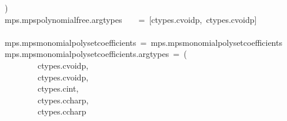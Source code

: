 \documentclass{article}\usepackage[]{graphicx}\usepackage[dvipsnames,table]{xcolor}
\makeatletter
\newcommand{\hlopt}[1]{\textcolor[rgb]{0,0,0}{#1}}%
\newcommand{\hldef}[1]{\textcolor[rgb]{0.345,0.345,0.345}{#1}}%
\newenvironment{kframe}{%
 \def\at@end@of@kframe{}%
 \ifinner\ifhmode%
  \def\at@end@of@kframe{\end{minipage}}%
  \begin{minipage}{\columnwidth}%
 \fi\fi%
 \def\FrameCommand##1{\hskip\@totalleftmargin \hskip-\fboxsep
 \colorbox{shadecolor}{##1}\hskip-\fboxsep
     \hskip-\linewidth \hskip-\@totalleftmargin \hskip\columnwidth}%
 \MakeFramed {\advance\hsize-\width
   \@totalleftmargin\z@ \linewidth\hsize
   \@setminipage}}%
 {\par\unskip\endMakeFramed%
 \at@end@of@kframe}
\newenvironment{knitrout}{}{} %
\makeatother
\begin{document}
\begin{center}
\begin{minipage}[m]{15cm}
\begin{knitrout}
\begin{kframe}
\hldef{}\hlopt{)}\hspace*{\fill}\\
\hldef{\textunderscore mps}\hlopt{.}\hldef{mps\textunderscore polynomial\textunderscore free}\hlopt{.}\hldef{argtypes}\hldef{\ \ \ \ }\hldef{}\hlopt{=\ {[}}\hldef{ctypes}\hlopt{.}\hldef{c\textunderscore void\textunderscore p}\hlopt{,\ }\hldef{ctypes}\hlopt{.}\hldef{c\textunderscore void\textunderscore p}\hlopt{{]}}\hspace*{\fill}\\
\hldef{}\hspace*{\fill}\\
\hldef{\textunderscore mps}\hlopt{.}\hldef{mps\textunderscore monomial\textunderscore poly\textunderscore set\textunderscore coefficient\textunderscore s\ }\hlopt{=\ }\hldef{\textunderscore mps}\hlopt{.}\hldef{mps\textunderscore monomial\textunderscore poly\textunderscore set\textunderscore coefficient\textunderscore s}\hspace*{\fill}\\
\hldef{\textunderscore mps}\hlopt{.}\hldef{mps\textunderscore monomial\textunderscore poly\textunderscore set\textunderscore coefficient\textunderscore s}\hlopt{.}\hldef{argtypes\ }\hlopt{=\ (}\hspace*{\fill}\\
\hldef{}\hldef{\ \ \ \ \ \ \ \ }\hldef{ctypes}\hlopt{.}\hldef{c\textunderscore void\textunderscore p}\hlopt{,}\hldef{\ \ \ \ \ \ \ \ \ \ \ \ \ }\hlopt{}\hldef{}\hspace*{\fill}\\
\hldef{}\hldef{\ \ \ \ \ \ \ \ }\hldef{ctypes}\hlopt{.}\hldef{c\textunderscore void\textunderscore p}\hlopt{,}\hldef{\ \ \ \ \ \ \ \ \ \ \ \ \ }\hlopt{}\hldef{}\hspace*{\fill}\\
\hldef{}\hldef{\ \ \ \ \ \ \ \ }\hldef{ctypes}\hlopt{.}\hldef{c\textunderscore int}\hlopt{,}\hldef{\ \ \ \ \ \ \ \ \ \ \ \ \ \ \ \ }\hlopt{}\hldef{}\hspace*{\fill}\\
\hldef{}\hldef{\ \ \ \ \ \ \ \ }\hldef{ctypes}\hlopt{.}\hldef{c\textunderscore char\textunderscore p}\hlopt{,}\hldef{\ \ \ \ \ \ \ \ \ \ \ \ \ }\hlopt{}\hldef{}\hspace*{\fill}\\
\hldef{}\hldef{\ \ \ \ \ \ \ \ }\hldef{ctypes}\hlopt{.}\hldef{c\textunderscore char\textunderscore p}\hldef{\ \ \ \ \ \ \ \ \ \ \ \ \ \ }\hldef{}\hspace*{\fill}\\

\end{kframe}
\end{knitrout}
\end{minipage}
\end{center}
\end{document}
